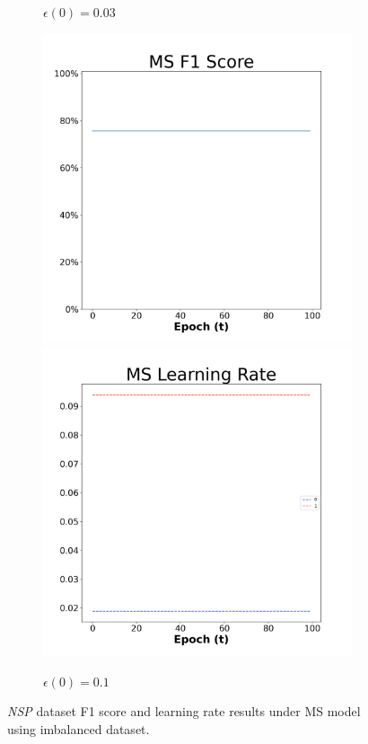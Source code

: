 \begin{figure}[H]
\begin{subfigure}{0.3\textwidth}
  \caption{$\epsilon(0)=0.03$}
\end{subfigure}\hfil %
\begin{subfigure}{0.3\textwidth}
  \includegraphics[width=\linewidth]{images/exper2/NSP/MS_0.1_f1.png}
  \includegraphics[width=\linewidth]{images/exper2/NSP/MS_0.1_lr.png}
  \caption{$\epsilon(0)=0.1$}
\end{subfigure}

\caption{\textit{NSP} dataset F1 score and learning rate results under MS model using imbalanced dataset.}
\end{figure}

